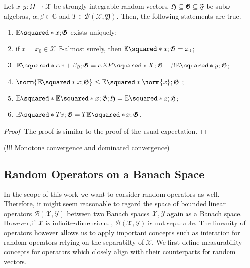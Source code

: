 \begin{lem}
    Let \( x,y: \Omega \to \mathcal{X} \) be strongly integrable random vectors, \( \mathfrak{H}\subseteq \mathfrak{G} \subseteq \mathfrak{F} \) be sub\(\omega\)-algebras, \( \alpha,\beta \in \mathbb{C} \) and \( T \in \mathcal{B}(\mathcal{X},\mathfrak{Y}) \). Then, the following statements are true.
    \begin{enumerate}[1)]
      \item \(\mathbb{E}\squared*{x;\mathfrak{G}}\) exists uniquely;
      \item if \( x=x_0 \in \mathcal{X}\) \( \mathbb{P} \)-almost surely, then \( \mathbb{E}\squared*{x;\mathfrak{G}}=x_0 \);
      \item \( \mathbb{E}\squared*{\alpha x+\beta y;\mathfrak{G}}= \alpha EE\squared*{X;\mathfrak{G}}+ \beta \mathbb{E}\squared*{y;\mathfrak{G}} \);
      \item \(\norm{\mathbb{E}\squared*{x;\mathfrak{G}}}_{} \leq \mathbb{E}\squared*{\norm{x}_{};\mathfrak{G}} \) ;
      \item \( \mathbb{E}\squared*{ \mathbb{E}\squared*{x;\mathfrak{G}};\mathfrak{H}} = \mathbb{E}\squared*{x;\mathfrak{H}} \);
      \item \( \mathbb{E}\squared*{Tx;\mathfrak{G}} = T \mathbb{E}\squared*{x;\mathfrak{G}} \).
    \end{enumerate}
    
\end{lem}

\begin{proof}
    The proof is similar to the proof of the usual expectation.
\end{proof}


\begin{thm}
  (!!! Monotone convergence and dominated convergence)
\end{thm}


\begin{defn}
    
\end{defn}




\subsection{Random Operators on a Banach Space}
In the scope of this work we want to consider random operators as well. Therefore, it might seem reasonable to regard the space of bounded linear operators \( \mathcal{B}(\mathcal{X},\mathcal{Y}) \) between two Banach spaces \( \mathcal{X}, \mathcal{Y}\) again as a Banach space. However,if \( \mathcal{X} \) is infinite-dimensional, \( \mathcal{B}(\mathcal{X},\mathcal{Y}) \) is not separable. The linearity of operators however allows us to apply important concepts such as interation for random operators relying on the separabilty of \( \mathcal{X} \). We first define measurability concepts for operators which closely align with their counterparts for random vectors.


